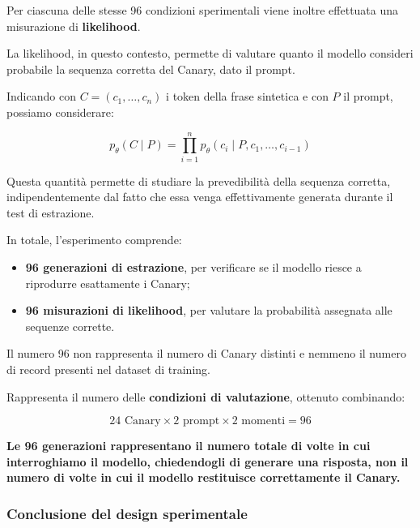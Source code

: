 Per ciascuna delle stesse 96 condizioni
sperimentali viene inoltre effettuata
una misurazione di \textbf{likelihood}.

La likelihood, in questo contesto,
permette di valutare quanto il modello
consideri probabile la sequenza
corretta del Canary, dato il prompt.

Indicando con $C=(c_1,\ldots,c_n)$
i token della frase sintetica e con
$P$ il prompt, possiamo considerare:

\begin{equation}
p_{\theta}(C \mid P)
=
\prod_{i=1}^{n}
p_{\theta}
\left(
c_i \mid P,c_1,\ldots,c_{i-1}
\right)
\end{equation}

Questa quantità permette di studiare
la prevedibilità della sequenza corretta,
indipendentemente dal fatto che essa
venga effettivamente generata
durante il test di estrazione.

In totale, l'esperimento comprende:

\begin{itemize}
    \item \textbf{96 generazioni di estrazione},
    per verificare se il modello riesce
    a riprodurre esattamente i Canary;

    \item \textbf{96 misurazioni di likelihood},
    per valutare la probabilità assegnata
    alle sequenze corrette.
\end{itemize}

\begin{observation}
    Il numero 96 non rappresenta il numero
    di Canary distinti e nemmeno il numero
    di record presenti nel dataset di training.

    Rappresenta il numero delle
    \textbf{condizioni di valutazione},
    ottenuto combinando:

    \[
    \boxed{
    24 \text{ Canary}
    \times
    2 \text{ prompt}
    \times
    2 \text{ momenti}
    = 96
    }
    \]
\end{observation}

\textbf{Le 96 generazioni rappresentano il numero totale di volte in cui interroghiamo il modello, chiedendogli di generare una risposta, non il numero di volte in cui il modello restituisce correttamente il Canary.}

\subsubsection{Conclusione del design sperimentale}

